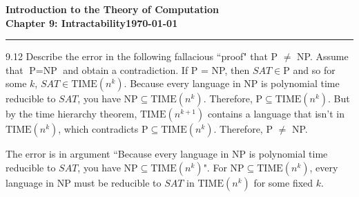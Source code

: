 \documentclass[11pt]{article}
\newcommand{\dated}{\today}
\begin{document}
\textbf{Introduction to the Theory of
Computation}\hfill\textbf{\myname}\\[0.01in]
\textbf{Chapter 9: Intractability}\hfill\textbf{\dated}\\
\smallskip\hrule\bigskip

\begin{problem}{9.12}
Describe the error in the following fallacious ``proof" that P $\neq$ NP. Assume that $\text{P} = \text{NP}$ and obtain a contradiction. If P = NP, then $SAT \in \text{P}$ and so for some $k$, $SAT \in \text{TIME}(n^k)$. Because every language in NP is polynomial time reducible to $SAT$, you have $\text{NP} \subseteq \text{TIME}(n^k)$. Therefore, $\text{P} \subseteq \text{TIME}(n^k)$. But by the time hierarchy theorem, $\text{TIME}(n^{k+1})$ contains a language that isn't in $\text{TIME}(n^k)$, which contradicts $\text{P} \subseteq \text{TIME}(n^k)$. Therefore, P $\neq$ NP.
\end{problem}

\begin{solution}
The error is in argument ``Because every language in NP is polynomial time reducible to $SAT$, you have $\text{NP} \subseteq \text{TIME}(n^k)$". For  $\text{NP} \subseteq \text{TIME}(n^k)$, every language in NP must be reducible to $SAT$ in $\text{TIME}(n^k)$ for some fixed $k$.
\end{solution}
\end{document}
